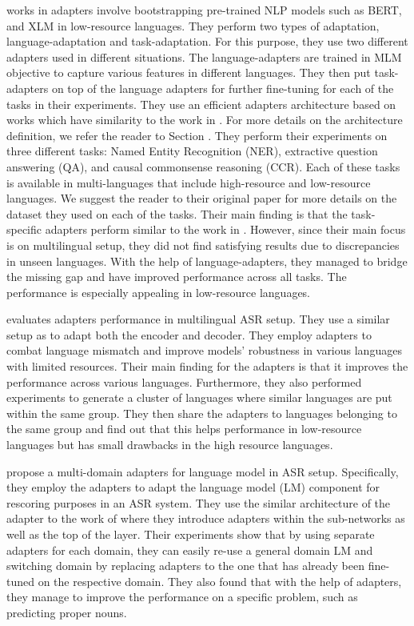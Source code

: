 \cite{pfeiffer2020madx} works in adapters involve bootstrapping pre-trained NLP models such as BERT, and XLM \cite{conneau2019cross} in low-resource languages. They perform two types of adaptation, language-adaptation and task-adaptation. For this purpose, they use two different adapters used in different situations. The language-adapters are trained in MLM objective to capture various features in different languages. They then put task-adapters on top of the language adapters for further fine-tuning for each of the tasks in their experiments. They use an efficient adapters architecture based on \cite{pfeiffer2021adapterfusion} works which have similarity to the work in \cite{bapna2019simple}. For more details on the architecture definition, we refer the reader to Section \label{sec:bm_adapters}. They perform their experiments on three different tasks: Named Entity Recognition (NER), extractive question answering (QA), and causal commonsense reasoning (CCR). Each of these tasks is available in multi-languages that include high-resource and low-resource languages. We suggest the reader to their original paper for more details on the dataset they used on each of the tasks. Their main finding is that the task-specific adapters perform similar to the work in \cite{houlsby2019parameter}. However, since their main focus is on multilingual setup, they did not find satisfying results due to discrepancies in unseen languages. With the help of language-adapters, they managed to bridge the missing gap and have improved performance across all tasks. The performance is especially appealing in low-resource languages.

\cite{winata2020adapt} evaluates adapters performance in multilingual ASR setup. They use a similar setup as \cite{bapna2019simple} to adapt both the encoder and decoder. They employ adapters to combat language mismatch and improve models' robustness in various languages with limited resources. Their main finding for the adapters is that it improves the performance across various languages. Furthermore, they also performed experiments to generate a cluster of languages where similar languages are put within the same group. They then share the adapters to languages belonging to the same group and find out that this helps performance in low-resource languages but has small drawbacks in the high resource languages.

\cite{lee2021adaptable} propose a multi-domain adapters for language model in ASR setup. Specifically, they employ the adapters to adapt the language model (LM) component for rescoring purposes in an ASR system. They use the similar architecture of the adapter to the work of \cite{houlsby2019parameter} where they introduce adapters within the sub-networks as well as the top of the layer. Their experiments show that by using separate adapters for each domain, they can easily re-use a general domain LM and switching domain by replacing adapters to the one that has already been fine-tuned on the respective domain. They also found that with the help of adapters, they manage to improve the performance on a specific problem, such as predicting proper nouns.

